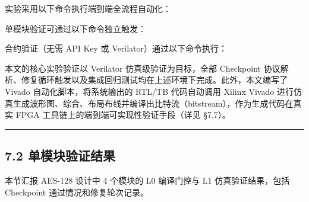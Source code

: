 实验采用以下命令执行端到端全流程自动化：

\begin{Shaded}
\begin{Highlighting}[]
\OperatorTok{=} 
\end{Highlighting}
\end{Shaded}

单模块验证可通过以下命令独立触发：

\begin{Shaded}
\begin{Highlighting}[]
\OperatorTok{=} \OperatorTok{\textless{}}\OperatorTok{\textgreater{}} \DataTypeTok{\textbackslash{}}
    \OperatorTok{\textless{}}\OperatorTok{\textgreater{}}
\end{Highlighting}
\end{Shaded}

合约验证（无需 API Key 或 Verilator）通过以下命令执行：

\begin{Shaded}
\begin{Highlighting}[]
\OperatorTok{=} 
\end{Highlighting}
\end{Shaded}

本文的核心实验验证以 Verilator 仿真级验证为目标，全部 Checkpoint
协议解析、修复循环触发以及集成回归测试均在上述环境下完成。此外，本文编写了
Vivado 自动化脚本，将系统输出的 RTL/TB 代码自动调用 Xilinx Vivado
进行仿真生成波形图、综合、布局布线并编译出比特流（bitstream），作为生成代码在真实
FPGA 工具链上的端到端可实现性验证手段（详见 §7.7）。

\begin{center}\rule{0.5\linewidth}{0.5pt}\end{center}

\subsection{7.2
单模块验证结果}\label{ux5355ux6a21ux5757ux9a8cux8bc1ux7ed3ux679c}

本节汇报 AES-128 设计中 4 个模块的 L0 编译门控与 L1 仿真验证结果，包括
Checkpoint 通过情况和修复轮次记录。

